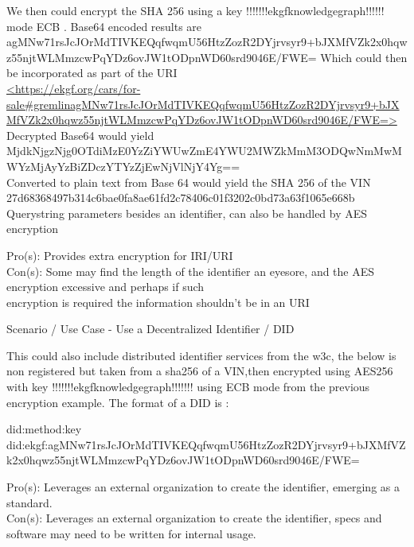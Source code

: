 We then could encrypt the SHA 256 using a key !!!!!!!ekgfknowledgegraph!!!!!! mode ECB .
Base64 encoded results are \\
{\footnotesize agMNw71rsJcJOrMdTIVKEQqfwqmU56HtzZozR2DYjrvsyr9+bJXMfVZk2x0hqwz55njtWLMmzcwPqYDz6ovJW1tODpnWD60srd9046E/FWE=}
Which could then be incorporated as part of the URI \\
    {\scriptsize\url{<https://ekgf.org/cars/for-sale#gremlinagMNw71rsJcJOrMdTIVKEQqfwqmU56HtzZozR2DYjrvsyr9+bJXMfVZk2x0hqwz55njtWLMmzcwPqYDz6ovJW1tODpnWD60srd9046E/FWE=>}} \\
Decrypted Base64 would yield \\
{\scriptsize MjdkNjgzNjg0OTdiMzE0YzZiYWUwZmE4YWU2MWZkMmM3ODQwNmMwMWYzMjAyYzBiZDczYTYzZjEwNjVlNjY4Yg== } \\
Converted to plain text from Base 64 would yield the SHA 256 of the VIN \\
27d68368497b314c6bae0fa8ae61fd2c78406c01f3202c0bd73a63f1065e668b \\
Querystring parameters besides an identifier, can also be handled by AES encryption

Pro(s): Provides extra encryption for IRI/URI \\
Con(s): Some may find the length of the identifier an eyesore, and the AES encryption excessive and perhaps if such \\
encryption is required the information shouldn’t be in an URI

Scenario / Use Case -
Use a Decentralized Identifier / DID

This could also include distributed identifier services from the w3c, the below is non registered but taken
from a sha256 of a VIN,then encrypted using AES256 with key !!!!!!!ekgfknowledgegraph!!!!!!! using ECB mode from the
previous encryption example.
The format of a DID is :

did:method:key \\
{\footnotesize did:ekgf:agMNw71rsJcJOrMdTIVKEQqfwqmU56HtzZozR2DYjrvsyr9+bJXMfVZk2x0hqwz55njtWLMmzcwPqYDz6ovJW1tODpnWD60srd9046E/FWE= }

Pro(s): Leverages an external organization to create the identifier, emerging as a standard. \\
Con(s): Leverages an external organization to create the identifier, specs and software may need to be written for
internal usage.
